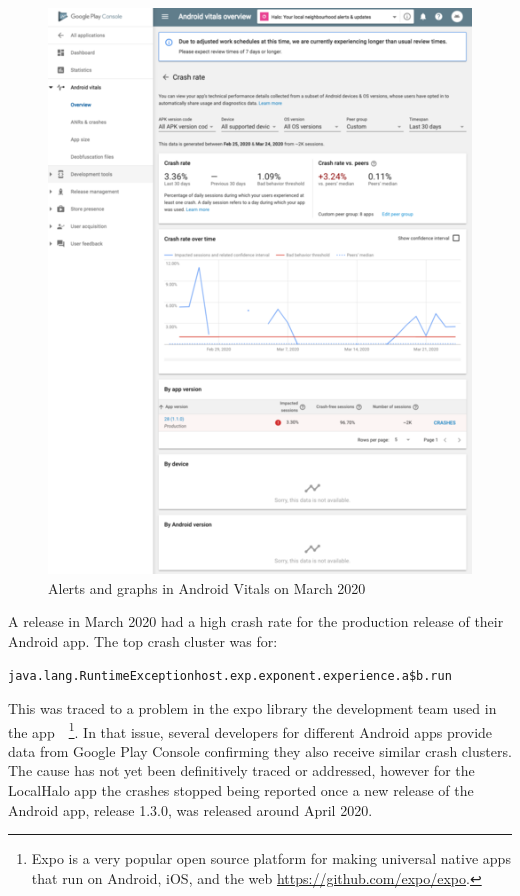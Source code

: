 \begin{figure}[htbp!]
\begin{minipage}{.45\textwidth}
\end{minipage}\hfill%
\begin{minipage}{.45\textwidth}
  \centering
  \includegraphics[width=\textwidth]{images/localhalo/apphealthdetailsplace_55505963_high_errors.png}
\end{minipage}
    \caption{Alerts and graphs in Android Vitals on  March 2020}
    \label{fig:localhalo-android-vitals-high-failures-26-march-2020}
\end{figure}

A release in March 2020 had a high crash rate for the production release of their Android app. The top crash cluster was for:

{\small \texttt{java.lang.RuntimeExceptionhost.exp.exponent.experience.a\$b.run}} 

This was traced to a problem in the expo library the development team used in the app~\citep{expo2019_issue5839}~\footnote{Expo is a very popular open source platform for making universal native apps that run on Android, iOS, and the web \url{https://github.com/expo/expo}.}. In that issue, several developers for different Android apps provide data from Google Play Console confirming they also receive similar crash clusters. The cause has not yet been definitively traced or addressed, however for the LocalHalo app the crashes stopped being reported once a new release of the Android app, release 1.3.0, was released around  April 2020.



